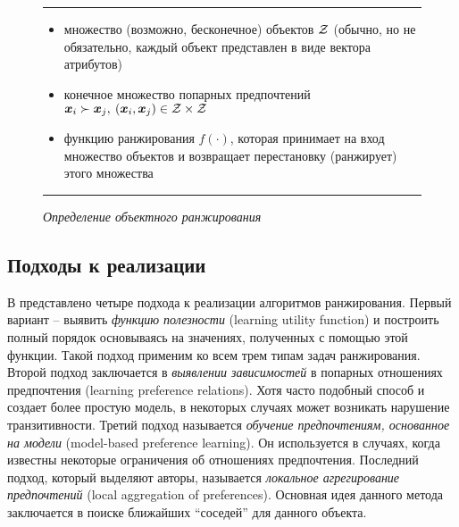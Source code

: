 		\begin{figure}[h]
			\hrule
			\begin{description}[nosep]
				\item[Дано:] \null\leavevmode
				\begin{itemize}[itemsep=0pt,leftmargin=2ex,label=\textbf{---}]
					\item множество (возможно, бесконечное) объектов $\mathcal{Z}$ (обычно, но не обязательно, каждый объект представлен в виде вектора атрибутов)
					\item конечное множество попарных предпочтений $\bm{x}_i \succ \bm{x}_j, \: (\bm{x}_i, \bm{x}_j) \in \mathcal{Z} \times \mathcal{Z}$
				\end{itemize}
				\item[Найти:] \null\leavevmode
				\begin{itemize}[itemsep=0pt,leftmargin=2ex,label=\textbf{---}]
					\item функцию ранжирования $f(\cdot)$, которая принимает на вход множество объектов и возвращает перестановку (ранжирует) этого множества
				\end{itemize}
			\end{description} 
			\hrule
			\caption{\it Определение объектного ранжирования \cite[Рис.~3]{plbook:Introduction:2010}}
			\label{fig:object_ranking}
		\end{figure}
	
	\subsection{Подходы к реализации}
		В \cite{plbook:Introduction:2010} представлено четыре подхода к реализации алгоритмов ранжирования. 
		Первый вариант – выявить \emph{функцию полезности} (learning utility function) и построить полный порядок основываясь на значениях, полученных с помощью этой функции. Такой подход применим ко всем трем типам задач ранжирования. 
		Второй подход заключается в \emph{выявлении зависимостей} в попарных отношениях предпочтения (learning preference relations). Хотя часто подобный способ и создает более простую модель, в некоторых случаях может возникать нарушение транзитивности\cite[стр.~10]{plbook:Introduction:2010}. 
		Третий подход называется \emph{обучение предпочтениям, основанное на модели} (model-based preference learning). Он используется в случаях, когда известны некоторые ограничения об отношениях предпочтения. 
		Последний подход, который выделяют авторы, называется \emph{локальное агрегирование предпочтений} (local aggregation of preferences). Основная идея данного метода заключается в поиске ближайших \enquote{соседей} для данного объекта.
		
